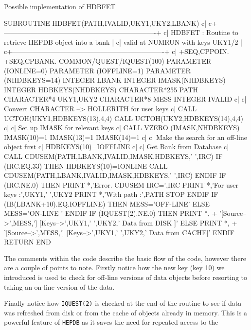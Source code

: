 \begin{XMPt}{Possible implementation of HDBFET}

      SUBROUTINE HDBFET(PATH,IVALID,UKY1,UKY2,LBANK)
c|
c+-------------------------------------------------------------------+
c|    HDBFET    : Routine to retrieve HEPDB object into a bank       |
c|                valid at NUMRUN with keys UKY1/2                   |
c+-------------------------------------------------------------------+
c|
+SEQ,CPPOIN.
+SEQ,CPBANK.
      COMMON/QUEST/IQUEST(100)
      PARAMETER       (IONLINE=0)
      PARAMETER       (IOFFLINE=1)
      PARAMETER       (NHDBKEYS=14)
      INTEGER          LBANK
      INTEGER          IMASK(NHDBKEYS)
      INTEGER          HDBKEYS(NHDBKEYS)
      CHARACTER*255    PATH
      CHARACTER*4      UKY1,UKY2
      CHARACTER*8      MESS
      INTEGER          IVALID
c|
c|    Convert CHARACTER --> HOLLERITH for user keys
c|
      CALL UCTOH(UKY1,HDBKEYS(13),4,4)
      CALL UCTOH(UKY2,HDBKEYS(14),4,4)
c|
c|  Set up IMASK for relevant keys
c|
      CALL VZERO (IMASK,NHDBKEYS)
      IMASK(10)=1
      IMASK(13)=1
      IMASK(14)=1
c|
c|    Make the search for an off-line object first
c|
      HDBKEYS(10)=IOFFLINE
c|
c|    Get Bank from Database
c|
      CALL CDUSEM(PATH,LBANK,IVALID,IMASK,HDBKEYS,' ',IRC)
      IF (IRC.EQ.33) THEN
         HDBKEYS(10)=IONLINE
         CALL CDUSEM(PATH,LBANK,IVALID,IMASK,HDBKEYS,' ',IRC)
      ENDIF
      IF (IRC.NE.0) THEN
         PRINT *,'Error. CDUSEM IRC=',IRC
         PRINT *,'For user keys :',UKY1,' ',UKY2
         PRINT *,'With path :',PATH
         STOP
      ENDIF
      IF (IB(LBANK+10).EQ.IOFFLINE) THEN
         MESS='OFF-LINE'
      ELSE
         MESS='ON-LINE '
      ENDIF
      IF (IQUEST(2).NE.0) THEN
        PRINT *,
     + '[Source-->',MESS,'] [Keys-->',UKY1,' ',UKY2,' Data from DISK ]'
      ELSE
        PRINT *,
     + '[Source-->',MESS,'] [Keys-->',UKY1,' ',UKY2,' Data from CACHE]'
      ENDIF
      RETURN
      END

\end{XMPt}
The comments within the code describe the basic flow of the code, however there
are a couple of points to note. Firstly notice how the new key (key 10) we introduced
is used to check for off-line versions of data objects before resorting to taking an
on-line version of the data.
\par
Finally notice how {\tt IQUEST(2)} is checked at the end of the routine to see if
data was refreshed from disk or from the cache of objects already in memory. This is
a powerful feature of {\tt HEPDB} as it saves the need for repeated access to the
